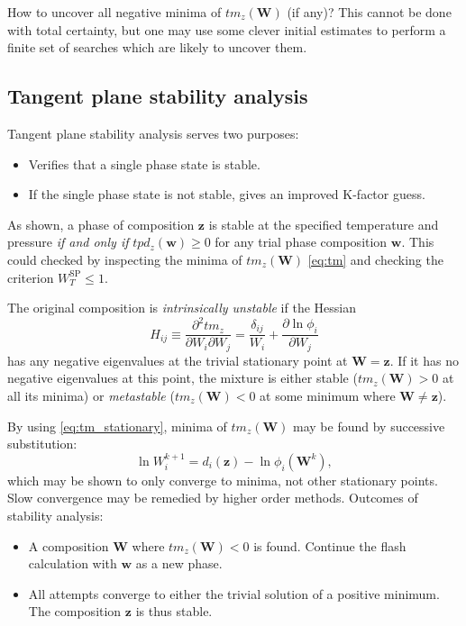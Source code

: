 \documentclass[english]{../thermomemo/thermomemo}
\newcommand*{\vektor}[1]{\boldsymbol{#1}}%
\begin{document}
How to uncover all negative minima of $\mathit{tm}_z(\vektor{W})$ (if any)?
This cannot be done with total certainty, but one may use some clever initial
estimates to perform a finite set of searches which are likely to uncover
them. 

\subsection{Tangent plane stability analysis}

Tangent plane stability analysis serves two purposes:
\begin{itemize}
  \item Verifies that a single phase state is stable.
  \item If the single phase state is not stable, gives an improved K-factor guess.
\end{itemize}
As shown, a phase of composition $\vektor{z}$ is stable at the specified temperature and pressure \textit{if and only if}
$tpd_z(\vektor{w}) \geq 0$ for any trial phase composition $\vektor{w}$. This could checked by inspecting the minima of 
$\mathit{tm}_z(\vektor{W})$ \eqref{eq:tm} and checking the criterion
$W_T^\text{SP} \leq 1$. 

The original composition is \textit{intrinsically unstable} if the Hessian 
\begin{equation}
  H_{ij} \equiv \frac{\partial^2 \mathit{tm}_z}{\partial W_i \partial W_j} 
  = \frac{\delta_{ij}}{W_i} + \frac{\partial \ln \phi_i}{\partial W_j}
  \label{}
\end{equation}
has any negative eigenvalues at the trivial stationary point at $\vektor{W}=\vektor{z}$. If it has no negative eigenvalues at 
this point, the mixture is either stable ($\mathit{tm}_z(\vektor{W}) > 0$ at all its minima) or 
\textit{metastable} ($\mathit{tm}_z(\vektor{W}) < 0$ at some minimum where $\vektor{W}\neq \vektor{z}$).

By using \eqref{eq:tm_stationary}, minima of $\mathit{tm}_z(\vektor{W})$ may be found by successive substitution:
\begin{equation}
  \ln W_i^{k+1} = d_i(\vektor{z}) - \ln \phi_i \left( \vektor{W}^k \right),
  \label{}
\end{equation}
which may be shown to only converge to minima, not other stationary points. Slow convergence may be remedied by higher order 
methods.
Outcomes of stability analysis:
\begin{itemize}
  \item A composition $\vektor{W}$ where $\mathit{tm}_z(\vektor{W}) < 0$ is found. Continue the flash calculation with $\vektor{w}$ 
    as a new phase.
  \item All attempts converge to either the trivial solution of a positive minimum. The composition $\vektor{z}$ is thus stable.
\end{itemize}
\end{document}

